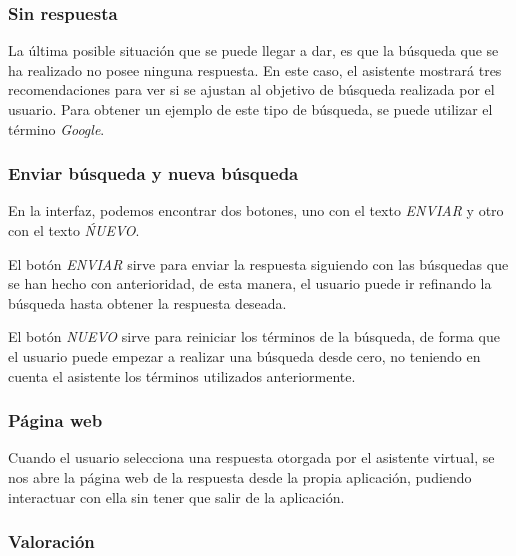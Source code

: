 \newpage

\subsubsection{Sin respuesta}

La última posible situación que se puede llegar a dar, es que la búsqueda que se ha realizado no posee ninguna respuesta. En este caso, el asistente mostrará tres recomendaciones para ver si se ajustan al objetivo de búsqueda realizada por el usuario. Para obtener un ejemplo de este tipo de búsqueda, se puede utilizar el término \textit{Google}.


\subsubsection{Enviar búsqueda y nueva búsqueda}

En la interfaz, podemos encontrar dos botones, uno con el texto \textit{ENVIAR} y otro con el texto \textit{ŃUEVO}.

El botón \textit{ENVIAR} sirve para enviar la respuesta siguiendo con las búsquedas que se han hecho con anterioridad, de esta manera, el usuario puede ir refinando la búsqueda hasta obtener la respuesta deseada.


El botón \textit{NUEVO} sirve para reiniciar los términos de la búsqueda, de forma que el usuario puede empezar a realizar una búsqueda desde cero, no teniendo en cuenta el asistente los términos utilizados anteriormente.


\subsubsection{Página web}

Cuando el usuario selecciona una respuesta otorgada por el asistente virtual, se nos abre la página web de la respuesta desde la propia aplicación, pudiendo interactuar con ella sin tener que salir de la aplicación.


\subsubsection{Valoración}

